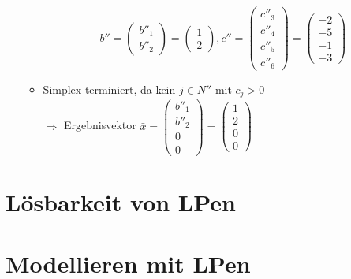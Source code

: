 \documentclass[a4paper,10pt]{article}
\begin{document}
\begin{enumerate}
\begin{itemize}
\[                 b'' = \begin{pmatrix}b''_1 \\ b''_2 \end{pmatrix} 
                   = \begin{pmatrix}1 \\ 2\end{pmatrix},
                 c'' = \begin{pmatrix}c''_3 \\ c''_4 \\ c''_5 \\ c''_6\end{pmatrix} 
                   = \begin{pmatrix}-2 \\ -5 \\ -1 \\ -3 \end{pmatrix}
                \]
        \item   Simplex terminiert, da kein $j \in N''$ mit $c_j > 0$\\
                $\Rightarrow$ Ergebnisvektor $\bar x = \begin{pmatrix}b''_1 \\ b''_2 \\ 0 \\ 0\end{pmatrix} = \begin{pmatrix}1 \\ 2 \\ 0 \\ 0\end{pmatrix}$
        \end{itemize}
\end{enumerate}

\section{Lösbarkeit von LPen}

\section{Modellieren mit LPen}



\end{document}
